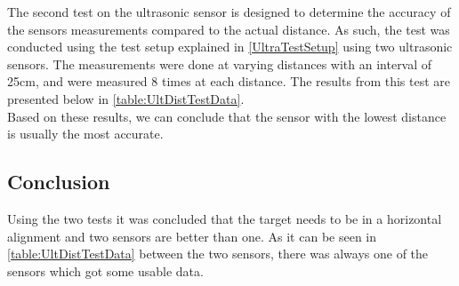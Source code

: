 The second test on the ultrasonic sensor is designed to determine the accuracy
of the sensors measurements compared to the actual distance. As such, the test
was conducted using the test setup explained in \autoref{UltraTestSetup} using
two ultrasonic sensors. The measurements were done at varying distances with an
interval of 25cm, and were measured 8 times at each distance. The results from
this test are presented below in \autoref{table:UltDistTestData}. \\
Based on these results, we can conclude that the sensor with the lowest
distance is usually the most accurate.

\subsection{Conclusion}
Using the two tests it was concluded that the target needs to be in a horizontal
alignment and two sensors are better than one. As it can be seen in
\autoref{table:UltDistTestData} between the two sensors, there was always one
of the sensors which got some usable data. 

% 





